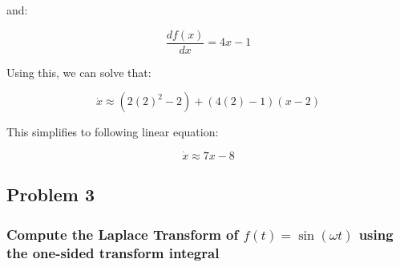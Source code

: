 \documentclass[12pt, letterpaper]{../assignment}
\begin{document}
and:

$$ \frac{d f(x)}{d x} = 4x - 1 $$

Using this, we can solve that:

$$ \dot{x} \approx (2(2)^2 - 2) + (4(2) - 1)(x-2)$$

This simplifies to following linear equation:

\begin{answer}
$$ \dot{x} \approx 7x - 8 $$
\end{answer}

\subsection*{Problem 3}
\subsubsection*{Compute the Laplace Transform of $f(t)=\sin(\omega t)$ using the one-sided transform integral}
\end{document}
